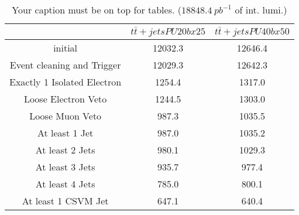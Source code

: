 \documentclass{article}
\begin{document}
\begin{table}
\caption{Your caption must be on top for tables. ($18848.4~pb^{-1}$ of int. lumi.)}
\label{tab:}
\centering
\begin{tabular}{|c|cc|}
\toprule
&$t\bar{t}+jets PU20bx25$	&$t\bar{t}+jets PU40bx50$	\\

\midrule
initial&	12032.3	&12646.4	\\

Event cleaning and Trigger&	12029.3	&12642.3	\\

Exactly 1 Isolated Electron&	1254.4	&1317.0	\\

Loose Electron Veto&	1244.5	&1303.0	\\

Loose Muon Veto&	987.3	&1035.5	\\

At least 1 Jet&	987.0	&1035.2	\\

At least 2 Jets&	980.1	&1029.3	\\

At least 3 Jets&	935.7	&977.4	\\

At least 4 Jets&	785.0	&800.1	\\

At least 1 CSVM Jet&	647.1	&640.4	\\

\bottomrule
\end{tabular}
\end{table}
\end{document}
